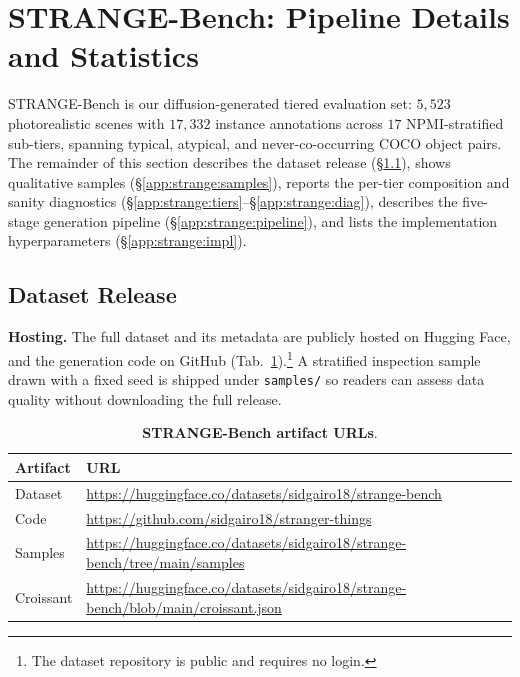 \section{STRANGE-Bench: Pipeline Details and Statistics}
\label{app:strange-pipeline}

STRANGE-Bench is our diffusion-generated tiered evaluation set: $5{,}523$ photorealistic scenes with $17{,}332$ instance annotations across $17$ NPMI-stratified sub-tiers, spanning typical, atypical, and never-co-occurring COCO object pairs. The remainder of this section describes the dataset release (\S\ref{app:strange:release}), shows qualitative samples (\S\ref{app:strange:samples}), reports the per-tier composition and sanity diagnostics (\S\ref{app:strange:tiers}--\S\ref{app:strange:diag}), describes the five-stage generation pipeline (\S\ref{app:strange:pipeline}), and lists the implementation hyperparameters
(\S\ref{app:strange:impl}).

\subsection{Dataset Release}
\label{app:strange:release}

\noindent\textbf{Hosting.}
The full dataset and its metadata are publicly hosted on Hugging Face, and the generation code on GitHub (Tab.~\ref{tab:strange_links}).\footnote{The dataset repository is public and requires no login.} A stratified inspection sample drawn with a fixed seed is shipped under \texttt{samples/} so readers can assess data quality without downloading the full release. 

\begin{table}[h]
\centering
\tiny
\setlength{\tabcolsep}{6pt}
\caption{\textbf{STRANGE-Bench artifact URLs}.}
\label{tab:strange_links}
\begin{tabular}{@{}ll@{}}
\toprule
Artifact & URL \\
\midrule
Dataset    & \url{https://huggingface.co/datasets/sidgairo18/strange-bench} \\
Code       & \url{https://github.com/sidgairo18/stranger-things} \\
Samples    & \url{https://huggingface.co/datasets/sidgairo18/strange-bench/tree/main/samples} \\
Croissant  & \url{https://huggingface.co/datasets/sidgairo18/strange-bench/blob/main/croissant.json} \\
\bottomrule
\end{tabular}
\end{table}

